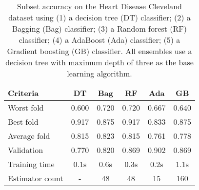 \begin{table}[htbp]
    \centering
    \label{tab:hdc_table}
    \begin{tabular}{l c c c c c}
    \toprule
    Criteria        & DT    & Bag       & RF    & Ada   & GB \\
    \midrule
    Worst fold      & 0.600 & 0.720     & 0.720 & 0.667 & 0.640\\
    Best fold       & 0.917 & 0.875     & 0.917 & 0.833 & 0.875\\
    Average fold    & 0.815 & 0.823     & 0.815 & 0.761 & 0.778\\
    Validation      & 0.770 & 0.820     & 0.869 & 0.902 & 0.869\\
    Training time   & 0.1s  & 0.6s      & 0.3s  & 0.2s  & 1.1s\\
    Estimator count & -     & 48        & 48    & 15    & 160\\
    \bottomrule
    \end{tabular}
    \caption{
        Subset accuracy on the Heart Disease Cleveland dataset using 
        (1) a decision tree (DT) classifier;
        (2) a Bagging (Bag) classifier;
        (3) a Random forest (RF) classifier; 
        (4) a AdaBoost (Ada) classifier; 
        (5) a Gradient boosting (GB) classifier.
        All ensembles use a decision tree with maximum depth of three as 
        the base learning algorithm.
    }
\end{table}